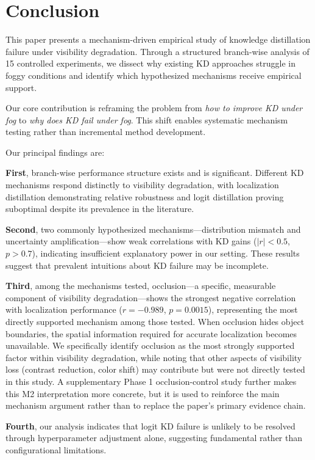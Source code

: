 \section{Conclusion}
\label{sec:conclusion}

This paper presents a mechanism-driven empirical study of knowledge distillation failure under visibility degradation. Through a structured branch-wise analysis of 15 controlled experiments, we dissect why existing KD approaches struggle in foggy conditions and identify which hypothesized mechanisms receive empirical support.

Our core contribution is reframing the problem from \emph{how to improve KD under fog} to \emph{why does KD fail under fog}. This shift enables systematic mechanism testing rather than incremental method development.

Our principal findings are:

\textbf{First}, branch-wise performance structure exists and is significant. Different KD mechanisms respond distinctly to visibility degradation, with localization distillation demonstrating relative robustness and logit distillation proving suboptimal despite its prevalence in the literature.

\textbf{Second}, two commonly hypothesized mechanisms---distribution mismatch and uncertainty amplification---show weak correlations with KD gains ($|r| < 0.5$, $p > 0.7$), indicating insufficient explanatory power in our setting. These results suggest that prevalent intuitions about KD failure may be incomplete.

\textbf{Third}, among the mechanisms tested, occlusion---a specific, measurable component of visibility degradation---shows the strongest negative correlation with localization performance ($r = -0.989$, $p = 0.0015$), representing the most directly supported mechanism among those tested. When occlusion hides object boundaries, the spatial information required for accurate localization becomes unavailable. We specifically identify occlusion as the most strongly supported factor within visibility degradation, while noting that other aspects of visibility loss (contrast reduction, color shift) may contribute but were not directly tested in this study. A supplementary Phase 1 occlusion-control study further makes this M2 interpretation more concrete, but it is used to reinforce the main mechanism argument rather than to replace the paper's primary evidence chain.

\textbf{Fourth}, our analysis indicates that logit KD failure is unlikely to be resolved through hyperparameter adjustment alone, suggesting fundamental rather than configurational limitations.

